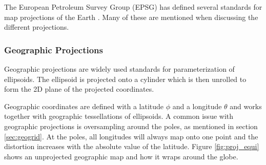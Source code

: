 The European Petroleum Survey Group (EPSG) \cite{epsg} has defined several standards for map projections of the Earth . Many of these are mentioned when discussing the different projections.

\subsubsection{Geographic Projections}

Geographic projections are widely used standards for parameterization of ellipsoids. The ellipsoid is projected onto a cylinder which is then unrolled to form the 2D plane of the projected coordinates.

Geographic coordinates are defined with a latitude $\phi$ and a longitude $\theta$ and works together with geographic tessellations of ellipsoids. A common issue with geographic projections is oversampling around the poles, as mentioned in section \ref{sec:geogrid}. At the poles, all longitudes will always map onto one point and the distortion increases with the absolute value of the latitude. Figure \ref{fig:proj_equi} shows an unprojected geographic map and how it wraps around the globe.

